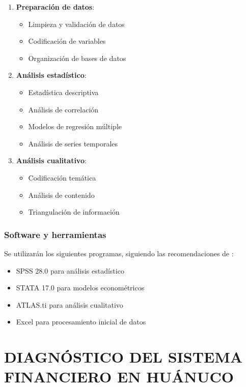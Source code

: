 \documentclass[12pt, a4paper]{article}
\begin{document}
\begin{enumerate}
    \item \textbf{Preparación de datos}:
    \begin{itemize}
        \item Limpieza y validación de datos
        \item Codificación de variables
        \item Organización de bases de datos
    \end{itemize}

    \item \textbf{Análisis estadístico}:
    \begin{itemize}
        \item Estadística descriptiva
        \item Análisis de correlación
        \item Modelos de regresión múltiple
        \item Análisis de series temporales
    \end{itemize}

    \item \textbf{Análisis cualitativo}:
    \begin{itemize}
        \item Codificación temática
        \item Análisis de contenido
        \item Triangulación de información
    \end{itemize}
\end{enumerate}

\subsubsection{Software y herramientas}

Se utilizarán los siguientes programas, siguiendo las recomendaciones de \textcite{Field2023}:

\begin{itemize}
    \item SPSS 28.0 para análisis estadístico
    \item STATA 17.0 para modelos econométricos
    \item ATLAS.ti para análisis cualitativo
    \item Excel para procesamiento inicial de datos
\end{itemize}

\section{DIAGNÓSTICO DEL SISTEMA FINANCIERO EN HUÁNUCO}
\end{document}
